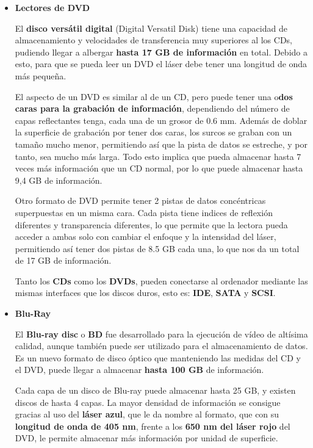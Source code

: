 \begin{itemize}
    \item \textbf{Lectores de DVD}

    El \textbf{disco versátil digital} (Digital Versatil Disk) tiene una capacidad de almacenamiento y velocidades de transferencia muy superiores al los CDs, pudiendo llegar a albergar \textbf{hasta 17 GB de información} en total. Debido a esto, para que se pueda leer un DVD el láser debe tener una longitud de onda más pequeña.

    El aspecto de un DVD es similar al de un CD, pero puede tener una o\textbf{dos caras para la grabación de información}, dependiendo del número de capas reflectantes tenga, cada una de un grosor de 0.6 mm. Además de doblar la superficie de grabación por tener dos caras, los surcos se graban con un tamaño mucho menor, permitiendo así que la pista de datos se estreche, y por tanto, sea mucho más larga. Todo esto implica que pueda almacenar hasta 7 veces más información que un CD normal, por lo que puede almacenar hasta 9,4 GB de información.

    Otro formato de DVD permite tener 2 pistas de datos concéntricas superpuestas en un misma cara. Cada pista tiene indices de reflexión diferentes y transparencia diferentes, lo que permite que la lectora pueda acceder a ambas solo con cambiar el enfoque y la intensidad del láser, permitiendo así tener dos pistas de 8.5 GB cada una, lo que nos da un total de 17 GB de información.

    Tanto los \textbf{CDs} como los \textbf{DVDs}, pueden conectarse al ordenador mediante las mismas interfaces que los discos duros, esto es: \textbf{IDE}, \textbf{SATA} y \textbf{SCSI}.

    \item \textbf{Blu-Ray}

    El \textbf{Blu-ray disc} o \textbf{BD} fue desarrollado para la ejecución de vídeo de altísima calidad, aunque también puede ser utilizado para el almacenamiento de datos. Es un nuevo formato de disco óptico que manteniendo las medidas del CD y el DVD, puede llegar a almacenar \textbf{hasta 100 GB} de información.

    Cada capa de un disco de Blu-ray puede almacenar hasta 25 GB, y existen discos de hasta 4 capas. La mayor densidad de información se consigue gracias al uso del \textbf{láser azul}, que le da nombre al formato, que con su \textbf{longitud de onda de 405 nm}, frente a los \textbf{650 nm del láser rojo} del DVD, le permite almacenar más información por unidad de superficie.


\end{itemize}
